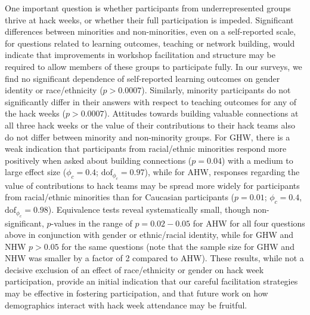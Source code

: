 One important question is whether participants from underrepresented groups thrive at hack weeks, or whether their full participation is impeded. Significant differences between minorities and non-minorities, even on a self-reported scale, for questions related to learning outcomes, teaching or network building, would indicate that improvements in workshop facilitation and structure may be required to allow members of these groups to participate fully.
In our surveys, we find no significant dependence of self-reported learning outcomes on gender identity or race/ethnicity ($p > 0.0007$). Similarly, minority participants do not significantly differ in their answers with respect to teaching outcomes for any of the hack weeks ($p > 0.0007$). Attitudes towards building valuable connections at all three hack weeks or the value of their contributions to their hack teams also do not differ between minority and non-minority groups. For GHW, there is a weak indication that participants from racial/ethnic minorities respond more positively when asked about building connections ($p=0.04$) with a medium to large effect size ($\phi_c = 0.4$; $\mathrm{dof}_{\phi_c} = 0.97$), while for AHW, responses regarding the value of contributions to hack teams may be spread more widely for participants from racial/ethnic minorities than for Caucasian participants ($p = 0.01$; $\phi_c = 0.4$, $\mathrm{dof}_{\phi_c} = 0.98$). Equivalence tests reveal systematically small, though non-significant, $p$-values in the range of $p=0.02-0.05$ for AHW for all four questions above in conjunction with gender or ethnic/racial identity, while for GHW and NHW $p > 0.05$ for the same questions (note that the sample size for GHW and NHW was smaller by a factor of 2 compared to AHW). These results, while not a decisive exclusion of an effect of race/ethnicity or gender on hack week participation, provide an initial indication that our careful facilitation strategies may be effective in fostering participation, and that future work on how demographics interact with hack week attendance may be fruitful.

